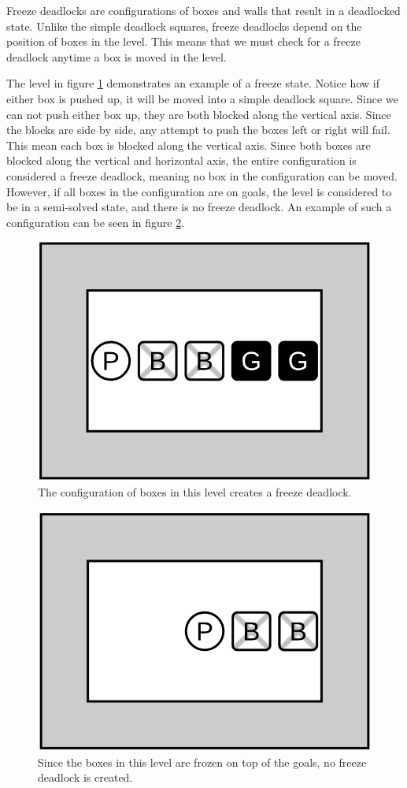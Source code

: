 \documentclass[times, 10pt,twocolumn]{article}
\begin{document}

Freeze deadlocks are configurations of boxes and walls that result in a deadlocked state. Unlike the simple deadlock squares, freeze deadlocks depend on the position of boxes in the level. This means that we must check for a freeze deadlock anytime a box is moved in the level. 

The level in figure \ref{fig:f} demonstrates an example of a freeze state. Notice how if either box is pushed up, it will be moved into a simple deadlock square. Since we can not push either box up, they are both blocked along the vertical axis. Since the blocks are side by side, any attempt to push the boxes left or right will fail. This mean each box is blocked along the vertical axis. Since both boxes are blocked along the vertical and horizontal axis, the entire configuration is considered a freeze deadlock, meaning no box in the configuration can be moved. However, if all boxes in the configuration are on goals, the level is considered to be in a semi-solved state, and there is no freeze deadlock. An example of such a configuration can be seen in figure \ref{fig:fok}.

\begin{figure}[h] 
  \centering
     \includegraphics[width=0.5\linewidth]{freeze_deadlock.png}
  \caption{The configuration of boxes in this level creates a freeze deadlock.}
  \label{fig:f}
\end{figure}

\begin{figure}[h] 
  \centering
     \includegraphics[width=0.5\linewidth]{freeze_deadlock_ok.png}
  \caption{Since the boxes in this level are frozen on top of the goals, no freeze deadlock is created.}
  \label{fig:fok}
\end{figure}
\end{document}
